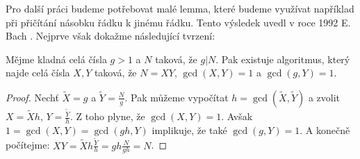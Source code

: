 Pro další práci budeme potřebovat malé lemma, které budeme využívat
například při přičítání násobku řádku k jinému řádku. Tento výsledek uvedl
v roce 1992 E. Bach \cite{Bach}. Nejprve však dokažme následující tvrzení:

\begin{lem} \label{factorization}
    Mějme kladná celá čísla $ g > 1 $ a $ N $ taková, že $ g | N $. Pak
    existuje algoritmus, který najde celá čísla $ X, Y $ taková, že
    $ N = XY $, $ \gcd(X, Y) = 1 $ a $ \gcd(g, Y) = 1 $.
\end{lem}
\begin{proof}
    Nechť $ \tilde{X} = g $ a $ \tilde{Y} = \frac{N}{g} $. Pak můžeme vypočítat
    $ h = \gcd(\tilde{X}, \tilde{Y}) $ a
    zvolit $ X = \tilde{X}h $, $ Y = \frac{\tilde{Y}}{h}$.
    Z toho plyne, že $ \gcd(X,Y) = 1 $. Avšak $ 1 = \gcd(X,Y) = \gcd(gh,Y) $
    implikuje, že také $ \gcd(g,Y) = 1 $. A konečně počítejme:
    $ XY = \tilde{X}h \frac{\tilde{Y}}{h} = gh \frac{N}{gh} = N $.
\end{proof}


